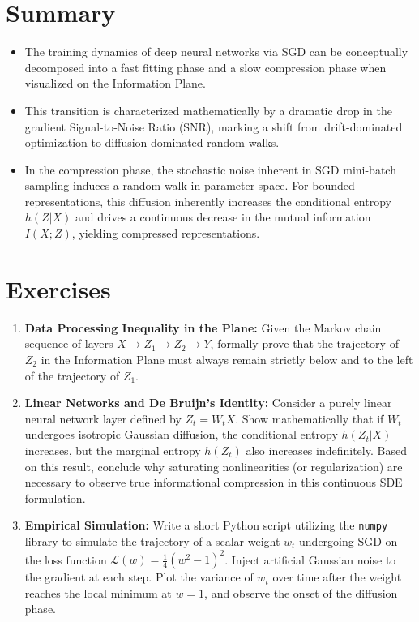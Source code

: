 \section{Summary}
\begin{itemize}
    \item The training dynamics of deep neural networks via SGD can be conceptually decomposed into a fast fitting phase and a slow compression phase when visualized on the Information Plane.
    \item This transition is characterized mathematically by a dramatic drop in the gradient Signal-to-Noise Ratio (SNR), marking a shift from drift-dominated optimization to diffusion-dominated random walks.
    \item In the compression phase, the stochastic noise inherent in SGD mini-batch sampling induces a random walk in parameter space. For bounded representations, this diffusion inherently increases the conditional entropy $h(Z|X)$ and drives a continuous decrease in the mutual information $I(X; Z)$, yielding compressed representations.
\end{itemize}

\section{Exercises}
\begin{enumerate}
    \item \textbf{Data Processing Inequality in the Plane:} Given the Markov chain sequence of layers $X \rightarrow Z_1 \rightarrow Z_2 \rightarrow Y$, formally prove that the trajectory of $Z_2$ in the Information Plane must always remain strictly below and to the left of the trajectory of $Z_1$.
    \item \textbf{Linear Networks and De Bruijn's Identity:} Consider a purely linear neural network layer defined by $Z_t = W_t X$. Show mathematically that if $W_t$ undergoes isotropic Gaussian diffusion, the conditional entropy $h(Z_t | X)$ increases, but the marginal entropy $h(Z_t)$ also increases indefinitely. Based on this result, conclude why saturating nonlinearities (or regularization) are necessary to observe true informational compression in this continuous SDE formulation.
    \item \textbf{Empirical Simulation:} Write a short Python script utilizing the \texttt{numpy} library to simulate the trajectory of a scalar weight $w_t$ undergoing SGD on the loss function $\mathcal{L}(w) = \frac{1}{4}(w^2 - 1)^2$. Inject artificial Gaussian noise to the gradient at each step. Plot the variance of $w_t$ over time after the weight reaches the local minimum at $w=1$, and observe the onset of the diffusion phase.
\end{enumerate}

